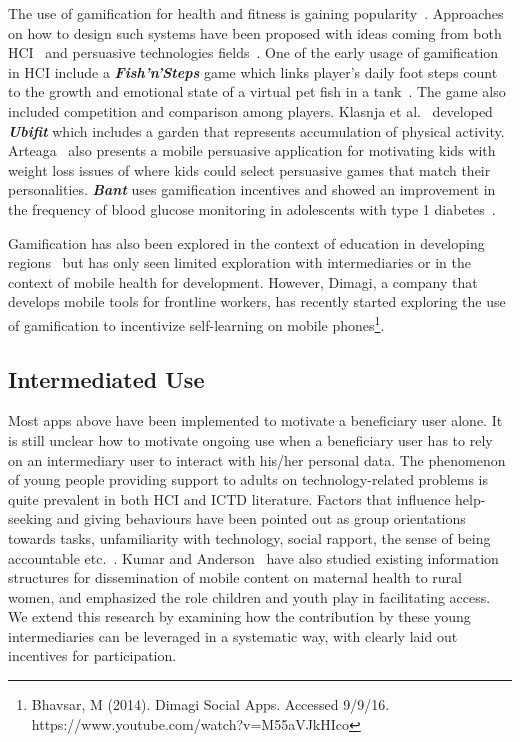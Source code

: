 \documentclass{sig-alternate}
\begin{document}
The use of gamification for health and fitness is gaining popularity~\cite{lister2014:just}. Approaches on how to design such systems have been proposed with ideas coming from both HCI~\cite{li2010:stage} and persuasive technologies fields~\cite{fogg2009:behaviour,Oinas-kukkonen:psd,Oinas-Kukkonen:foundation}. One of the early usage of gamification in HCI include a \emph{\textbf{Fish'n'Steps}} game which links player's daily foot steps count to the growth and emotional state of a virtual pet fish in a tank~\cite{lin2006:fish}. The game also included competition and comparison among players. Klasnja et al.~\cite{klasnja2009:using} developed \emph{\textbf{Ubifit}} which includes a garden that represents accumulation of physical activity. Arteaga~\cite{arteaga2010:persuasive} also presents a mobile persuasive application for motivating kids with weight loss issues of where kids could select persuasive games that match their personalities. \emph{\textbf{Bant}} uses gamification incentives and showed an improvement in the frequency of blood glucose monitoring in adolescents with type 1 diabetes~\cite{cafazzo2012:bant}. 

Gamification has also been explored in the context of education in developing regions~\cite{kam2008designing,botha2015icts} but has only seen limited exploration with intermediaries or in the context of mobile health for development.  However, Dimagi, a company that develops mobile tools for frontline workers, has recently started exploring the use of gamification to incentivize self-learning on mobile phones\footnote{Bhavsar, M (2014). Dimagi Social Apps. Accessed 9/9/16. https://www.youtube.com/watch?v=M55aVJkHIco}.

\subsection{Intermediated Use}
Most apps above have been implemented to motivate a beneficiary user alone. It is still unclear how to motivate ongoing use when a beneficiary user has to rely on an intermediary user to interact with his/her personal data. The phenomenon of young people providing support to adults on technology-related problems is quite prevalent in both HCI and ICTD literature. Factors that influence help-seeking and giving behaviours have been pointed out as group orientations towards tasks, unfamiliarity with technology, social rapport, the sense of being accountable etc.~\cite{sambasivan2010,poole:chh,kiesler:twi,parikh2006}. Kumar and Anderson~\cite{kumar2015mobile} have also studied existing information structures for dissemination of mobile content on maternal health to rural women, and emphasized the role children and youth play in facilitating access. 
We extend this research by examining how the contribution by these young intermediaries can be leveraged in a systematic way, with clearly laid out incentives for participation.  
\end{document}
